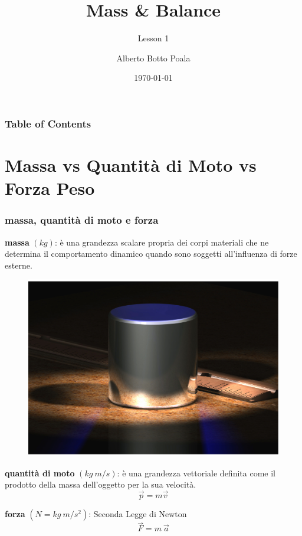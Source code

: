 \documentclass{beamer}
\title{Mass \& Balance}
\subtitle{Lesson 1}
\author{Alberto Botto Poala}
\institute{AeC Biella}
\date{\today}
\begin{document}
\begin{frame}
\titlepage
\end{frame} 

\begin{frame}
\frametitle{Table of Contents}
\tableofcontents
\end{frame} 

\section{Massa vs Quantità di Moto vs Forza Peso}
\begin{frame}
\frametitle{massa, quantità di moto e forza}
\textbf{massa} $(kg)$: è una grandezza scalare propria dei corpi materiali che ne determina il comportamento dinamico quando sono soggetti all'influenza di forze esterne.
\begin{figure}
\includegraphics[scale=0.14]{./images/1kg}
\end{figure}
\pause

\textbf{quantità di moto} $(kg \ m/s)$: è una grandezza vettoriale definita come il prodotto della massa dell'oggetto per la sua velocità.
$$\vec{p} = m \vec{v}$$
\pause

\textbf{forza} $(N = kg \ m / s^2 )$: Seconda Legge di Newton 
$$\vec{F} = m \  \vec{a}$$ 
\end{frame}
\end{document}
